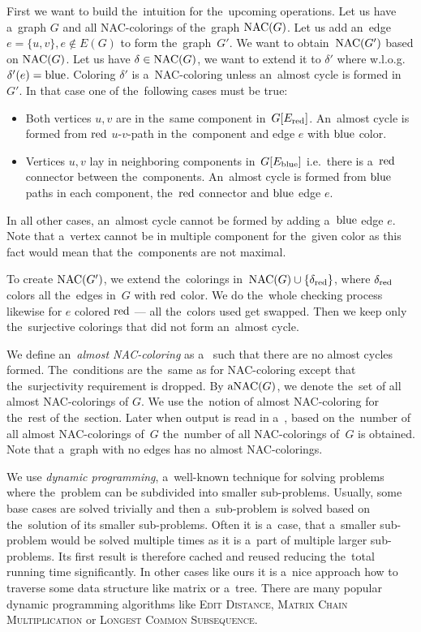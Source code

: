 First we want to build the~intuition for the~upcoming operations.
Let us have a~graph \( G \) and all NAC-colorings of the~graph \( \operatorname{NAC}(G) \).
Let us add an~edge \( e = \{u, v\}, e \not\in E(G) \) to form the~graph~\( G' \).
We want to obtain~\( \operatorname{NAC}(G') \) based on \( \operatorname{NAC}(G) \).
%
Let us have \( \delta \in \operatorname{NAC}(G) \),
we want to extend it to \( \delta' \) where w.l.o.g.\ \( \delta'(e) = \text{blue} \).
Coloring \( \delta' \) is a~NAC-coloring unless an~almost cycle is formed in~\( G' \).
In that case one of the~following cases must be true:
%
\begin{itemize}
	\item Both vertices \( u, v \) are in the~same component in~\( G[E_\text{red}] \).
	      An~almost cycle is formed
	      from \( \text{red} \) \( u \)-\( v \)-path in the~component
	      and edge \( e \) with \( \text{blue} \) color.
	\item Vertices \( u, v \) lay in neighboring components in~\( G[E_\text{blue}] \)
	      i.e.\ there is a~\( \text{red} \) connector between the~components.
	      An~almost cycle is formed from \( \text{blue} \) paths in each component,
	      the~\( \text{red} \) connector and \( \text{blue} \) edge \( e \).
\end{itemize}
%
In all other cases, an~almost cycle cannot be formed by adding a~\( \text{blue} \) edge \( e \).
Note that a~vertex cannot be in multiple component for the~given color
as this fact would mean that the~components are not maximal.

To create \( \operatorname{NAC}(G') \), we extend the~colorings
in~\( \operatorname{NAC}(G) \cup \{ \delta_{\text{red}} \} \), where \( \delta_{\text{red}} \)
colors all the~edges in~\( G \) with \( \text{red} \) color.
We do the~whole checking process likewise
for \( e \) colored \( \text{red} \) --- all the~colors used get swapped.
Then we keep only the~surjective colorings that did not form an~almost cycle.

We define an~\emph{almost NAC-coloring}
as a~\rbcol{} such that there are no almost cycles formed.
The~conditions are the~same as for NAC-coloring
except that the~surjectivity requirement is dropped.
By \( \operatorname{aNAC}(G) \), we denote the~set of all almost NAC-colorings of \( G \).
We use the~notion of almost NAC-coloring for the~rest of the~section.
Later when output is read in a~\RootNode{},
based on the~number of all almost NAC-colorings of~\( G \)
the~number of all NAC-colorings of~\( G \) is obtained.
Note that a~graph with no edges has no almost NAC-colorings.

We use \emph{dynamic programming}, a~well-known technique for solving problems
where the~problem can be subdivided into smaller sub-problems.
Usually, some base cases are solved trivially and then a~sub-problem
is solved based on the~solution of its smaller sub-problems.
%
Often it is a~case, that a~smaller sub-problem would be solved multiple times
as it is a~part of multiple larger sub-problems.
Its first result is therefore cached and reused
reducing the~total running time significantly.
%
In other cases like ours it is a~nice approach how to traverse
some data structure like matrix or a~tree.
%
There are many popular dynamic programming algorithms
like \textsc{Edit Distance}, \textsc{Matrix Chain Multiplication} or \textsc{Longest Common Subsequence}.

